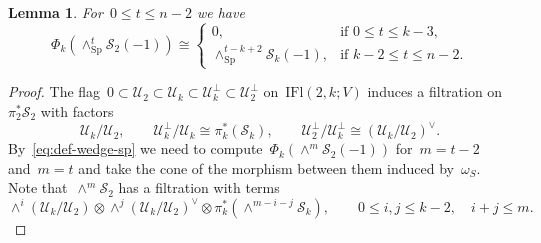 \documentclass[a4paper]{article}
\newcommand{\Sp}{\mathrm{Sp}}
\newcommand{\IFl}{\mathrm{IFl}}
\newcommand{\cU}{\mathcal{U}}
\newcommand{\cS}{\mathcal{S}}
\newtheorem{lemma}[theorem]{Lemma}
\theoremstyle{remark}
\theoremstyle{definition}
\begin{document}
\begin{lemma}
\label{lem:phi-cs}
For~\(0 \le t \le n - 2\) we have
\begin{equation}
\label{eq:phi-k-wt-sp-cs-m1}
\Phi_k(\wedge^t_\Sp\cS_2(-1)) \cong 
\begin{cases}
0, & \text{if~\(0 \le t \le k - 3\)},\\
\wedge^{t-k+2}_\Sp\cS_k(-1), & \text{if~\(k - 2 \le t \le n - 2\)}.
\end{cases}
\end{equation}
\end{lemma}
\begin{proof}
The flag~\(0 \subset \cU_2 \subset \cU_k \subset \cU_k^\perp \subset \cU_2^\perp\) on~\(\IFl(2,k;V)\)
induces a filtration on~\(\pi_2^*\cS_2\) with factors
\begin{equation*}
\cU_k / \cU_2,
\qquad 
\cU_k^\perp/\cU_k \cong \pi_k^*(\cS_k),
\qquad 
\cU_2^\perp / \cU_k^\perp \cong (\cU_k / \cU_2)^\vee.
\end{equation*}
By~\eqref{eq:def-wedge-sp} we need to compute~\(\Phi_k(\wedge^m\cS_2(-1))\) for~\(m = t - 2\) and~\(m = t\) and take the cone of the morphism between them induced by~\(\omega_S\). 
Note that~\(\wedge^m\cS_2\) has a filtration with terms
\begin{equation*}
\wedge^i(\cU_k/\cU_2) \otimes \wedge^j(\cU_k/\cU_2)^\vee \otimes \pi_k^*(\wedge^{m-i-j} \cS_k),
\qquad 
0 \le i,j \le k - 2,\quad i + j \le m.
\end{equation*}


\end{proof}
\end{document}
